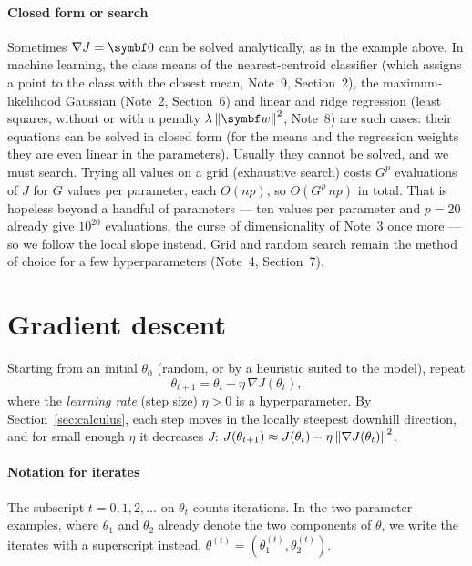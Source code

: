 \documentclass[11pt]{article}
\begin{document}
\paragraph{Closed form or search} Sometimes $\nabla J = \vect{0}$ can be solved analytically, as in the example above.
In machine learning, the class means of the nearest-centroid classifier (which assigns a point to the class with the
closest mean, Note~9, Section~2), the maximum-likelihood Gaussian (Note~2, Section~6) and linear and ridge regression
(least squares, without or with a penalty $\lambda\norm{\vect{w}}^2$, Note~8) are such cases: their equations can be solved in
closed form (for the means and the regression weights they are even linear in the parameters). Usually they cannot be
solved, and we must search. Trying all
values on a grid (exhaustive search) costs $G^p$ evaluations of $J$ for $G$ values per parameter, each $O(np)$, so
$O(G^p\,np)$ in total. That is hopeless beyond a handful of parameters --- ten values per parameter and $p = 20$
already give $10^{20}$ evaluations, the curse of dimensionality of Note~3 once more --- so we follow the local slope
instead. Grid and random search remain the method of choice for a few hyperparameters (Note~4, Section~7).

\section{Gradient descent}\label{sec:gd}

Starting from an initial $\theta_0$ (random, or by a heuristic suited to the model), repeat
\begin{equation}\label{eq:gd}
  \theta_{t+1} = \theta_t - \eta\, \nabla J(\theta_t),
\end{equation}
where the \emph{learning rate} (step size) $\eta > 0$ is a hyperparameter. By Section~\ref{sec:calculus}, each step
moves in the locally steepest downhill direction, and for small enough $\eta$ it decreases $J$:
$J(\theta_{t+1}) \approx J(\theta_t) - \eta\left\lVert \nabla J(\theta_t) \right\rVert^2$.

\paragraph{Notation for iterates} The subscript $t = 0, 1, 2, \dots$ on $\theta_t$ counts iterations. In the
two-parameter examples, where $\theta_1$ and $\theta_2$ already denote the two components of $\theta$, we write the
iterates with a superscript instead, $\theta^{(t)} = (\theta^{(t)}_1, \theta^{(t)}_2)$.
\end{document}
